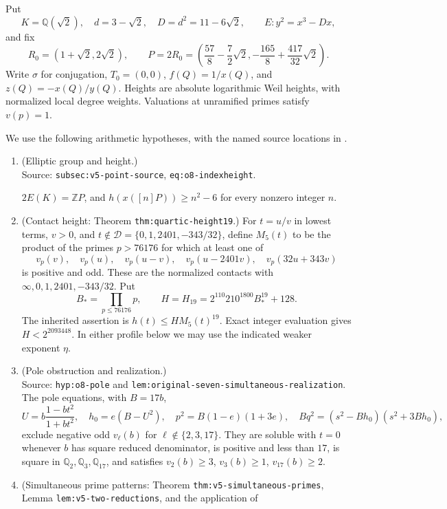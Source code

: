 \documentclass[11pt,a4paper]{article}
\theoremstyle{definition}
\theoremstyle{remark}
\begin{document}
Put
\[
 K=\mathbb Q(\sqrt2),\quad d=3-\sqrt2,\quad D=d^2=11-6\sqrt2,
 \qquad E:y^2=x^3-Dx,
\]
and fix
\[
 R_0=(1+\sqrt2,2\sqrt2),\qquad
 P=2R_0=\left(\frac{57}{8}-\frac72\sqrt2,
          -\frac{165}{8}+\frac{417}{32}\sqrt2\right).
\]
Write $\sigma$ for conjugation, $T_0=(0,0)$, $f(Q)=1/x(Q)$,
and $z(Q)=-x(Q)/y(Q)$.  Heights are absolute logarithmic Weil
heights, with normalized local degree weights.  Valuations at
unramified primes satisfy $v(p)=1$.

We use the following arithmetic hypotheses, with the named source
locations in \cite{RepositoryV9}.
\begin{enumerate}
\item (Elliptic group and height.)\\
      Source: \nolinkurl{subsec:v5-point-source}, \nolinkurl{eq:o8-indexheight}.\par $2E(K)=\mathbb ZP$, and
      $h(x([n]P))\ge n^2-6$ for every nonzero integer $n$.
\item (Contact height: Theorem \nolinkurl{thm:quartic-height19}.)
      For $t=u/v$ in lowest terms, $v>0$, and
      $t\notin\mathcal D=\{0,1,2401,-343/32\}$, define $M_5(t)$
      to be the product of the primes $p>76176$ for which at least one of
\[
 v_p(v),\quad v_p(u),\quad v_p(u-v),\quad
 v_p(u-2401v),\quad v_p(32u+343v)
\]
      is positive and odd.  These are the normalized contacts with
      $\infty,0,1,2401,-343/32$.  Put
\[
 B_* =\prod_{p\le76176}p,\qquad
 H=H_{19}=2^{110}210^{1800}B_*^{19}+128.
\]
      The inherited assertion is $h(t)\le H M_5(t)^{19}$.
      Exact integer evaluation gives $H<2^{2093448}$.
      In either profile below we may use the indicated weaker exponent $\eta$.
\item (Pole obstruction and realization.)\\
      Source: \nolinkurl{hyp:o8-pole} and
      \nolinkurl{lem:original-seven-simultaneous-realization}.
      The pole equations, with $B=17b$,
\[
 U=b\frac{1-bt^2}{1+bt^2},\quad h_0=e(B-U^2),\quad
 p^2=B(1-e)(1+3e),\quad
 Bq^2=(s^2-Bh_0)(s^2+3Bh_0),
\]
      exclude negative odd $v_\ell(b)$ for $\ell\notin\{2,3,17\}$.
      They are soluble with $t=0$ whenever $b$ has square reduced
      denominator, is positive and less than $17$, is square in
      $\mathbb Q_2,\mathbb Q_3,\mathbb Q_{17}$, and satisfies
      $v_2(b)\ge3$, $v_3(b)\ge1$, $v_{17}(b)\ge2$.
\item (Simultaneous prime patterns: Theorem \nolinkurl{thm:v5-simultaneous-primes},
      Lemma \nolinkurl{lem:v5-two-reductions}, and the application of

\end{enumerate}
\end{document}
